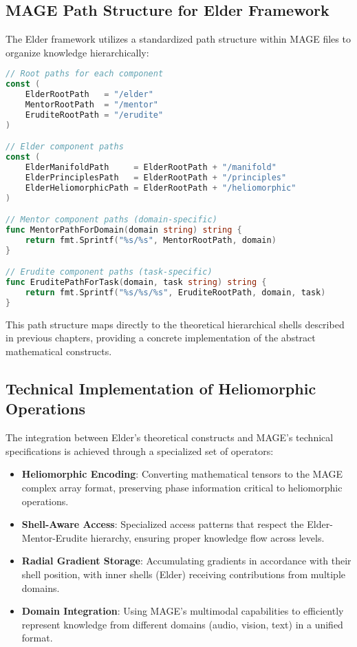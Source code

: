 \subsection{MAGE Path Structure for Elder Framework}

The Elder framework utilizes a standardized path structure within MAGE files to organize knowledge hierarchically:

\begin{lstlisting}[language=go, caption=Elder Path Structure in MAGE Files]
// Root paths for each component
const (
    ElderRootPath   = "/elder"
    MentorRootPath  = "/mentor"
    EruditeRootPath = "/erudite"
)

// Elder component paths
const (
    ElderManifoldPath     = ElderRootPath + "/manifold"
    ElderPrinciplesPath   = ElderRootPath + "/principles"
    ElderHeliomorphicPath = ElderRootPath + "/heliomorphic"
)

// Mentor component paths (domain-specific)
func MentorPathForDomain(domain string) string {
    return fmt.Sprintf("%s/%s", MentorRootPath, domain)
}

// Erudite component paths (task-specific)
func EruditePathForTask(domain, task string) string {
    return fmt.Sprintf("%s/%s/%s", EruditeRootPath, domain, task)
}
\end{lstlisting}

This path structure maps directly to the theoretical hierarchical shells described in previous chapters, providing a concrete implementation of the abstract mathematical constructs.

\subsection{Technical Implementation of Heliomorphic Operations}

The integration between Elder's theoretical constructs and MAGE's technical specifications is achieved through a specialized set of operators:

\begin{itemize}
    \item \textbf{Heliomorphic Encoding}: Converting mathematical tensors to the MAGE complex array format, preserving phase information critical to heliomorphic operations.
    \item \textbf{Shell-Aware Access}: Specialized access patterns that respect the Elder-Mentor-Erudite hierarchy, ensuring proper knowledge flow across levels.
    \item \textbf{Radial Gradient Storage}: Accumulating gradients in accordance with their shell position, with inner shells (Elder) receiving contributions from multiple domains.
    \item \textbf{Domain Integration}: Using MAGE's multimodal capabilities to efficiently represent knowledge from different domains (audio, vision, text) in a unified format.
\end{itemize}


